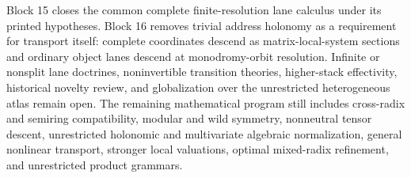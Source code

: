 Block 15 closes the common complete finite-resolution lane calculus under its printed hypotheses. Block 16 removes trivial address holonomy as a requirement for transport itself: complete coordinates descend as matrix-local-system sections and ordinary object lanes descend at monodromy-orbit resolution. Infinite or nonsplit lane doctrines, noninvertible transition theories, higher-stack effectivity, historical novelty review, and globalization over the unrestricted heterogeneous atlas remain open. The remaining mathematical program still includes cross-radix and semiring compatibility, modular and wild symmetry, nonneutral tensor descent, unrestricted holonomic and multivariate algebraic normalization, general nonlinear transport, stronger local valuations, optimal mixed-radix refinement, and unrestricted product grammars.
